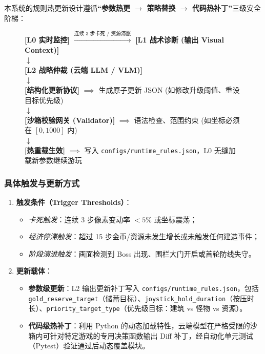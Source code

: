 \documentclass[11pt,a4paper]{ctexart}
\begin{document}
本系统的规则热更新设计遵循\textbf{“参数热更 $\to$ 策略替换 $\to$ 代码热补丁”}三级安全阶梯：

\begin{figure}[htbp]
\centering
\begin{tcolorbox}[colback=gray!5!white,colframe=gray!75!black,title=规则动态热更新流向图]
\centering
\small
\textbf{[L0 实时监控]} $\xrightarrow{\text{连续 3 步卡死 / 资源滞胀}}$ \textbf{[L1 战术诊断 (输出 Visual Context)]} \\
$\downarrow$ \\
\textbf{[L2 战略仲裁 (云端 LLM / VLM)]} \\
$\downarrow$ \\
\textbf{[结构化更新协议]} $\implies$ 生成原子更新 JSON (如修改升级阈值、重设目标优先级) \\
$\downarrow$ \\
\textbf{[沙箱校验网关 (Validator)]} $\implies$ 语法检查、范围约束 (如坐标必须在 $[0, 1000]$ 内) \\
$\downarrow$ \\
\textbf{[热重载生效]} $\implies$ 写入 \texttt{configs/runtime\_rules.json}，L0 无缝加载新参数继续游玩
\end{tcolorbox}
\end{figure}

\subsubsection{具体触发与更新方式}
\begin{enumerate}
  \item \textbf{触发条件（Trigger Thresholds）}：
    \begin{itemize}
      \item \textit{卡死触发}：连续 3 步像素变动率 $<5\%$ 或坐标震荡；
      \item \textit{经济停滞触发}：超过 15 步金币/资源未发生增长或未触发任何建造事件；
      \item \textit{阶段演进触发}：画面检测到 Boss 出现、围栏大门开启或首轮防线失守。
    \end{itemize}
  \item \textbf{更新载体}：
    \begin{itemize}
      \item \textbf{参数级更新}：L2 输出更新补丁写入 \texttt{configs/runtime\_rules.json}，包括 \texttt{gold\_reserve\_target}（储蓄目标）、\texttt{joystick\_hold\_duration}（按压时长）、\texttt{priority\_target\_type}（优先级目标：建筑 vs 怪物 vs 资源）。
      \item \textbf{代码级热补丁}：利用 Python 的动态加载特性，云端模型在严格受限的沙箱内可针对特定游戏的专用决策函数输出 Diff 补丁，经自动化单元测试（Pytest）验证通过后动态覆盖模块。
    \end{itemize}
\end{enumerate}
\end{document}
